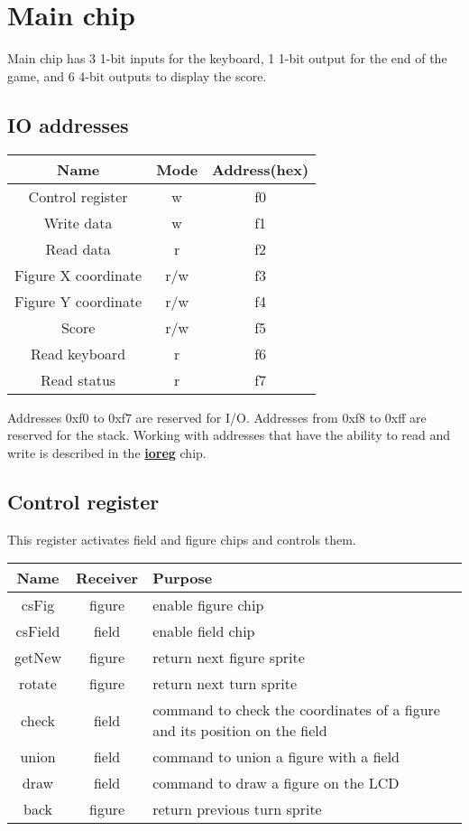 \documentclass[./main.tex]{subfiles}
\begin{document}
	\section{Main chip}
	Main chip has 3 1-bit inputs for the keyboard, 1 1-bit output for the end of the game, and 6 4-bit outputs to display the score.
	\subsection{IO addresses}
	\begin{center}
		\begin{tabular}{|c | c | c|}
			\hline
			Name & Mode & Address(hex) \\
			\hline
			Control register & w & f0 \\
			\hline
			Write data & w & f1 \\
			\hline
			Read data & r & f2 \\
			\hline
			Figure X coordinate & r/w & f3 \\
			\hline
			Figure Y coordinate & r/w & f4 \\
			\hline
			Score & r/w & f5 \\
			\hline
			Read keyboard & r & f6 \\
			\hline
			Read status & r & f7\\
			\hline
		\end{tabular}
	\end{center}


	Addresses 0xf0 to 0xf7 are reserved for I/O.  Addresses from 0xf8 to 0xff are reserved for the stack. Working with addresses that have the ability to read and write is described in the \hyperref[sec:ioreg]{\textbf{ioreg}} chip.
	\subsection{Control register}
	
	
	This register activates field and figure chips and controls them.
	\begin{center}
		\begin{tabular}{|c | c | p{10cm}|}
			\hline
			Name & Receiver & Purpose \\
			\hline
			csFig & figure & enable figure chip \\ 
			\hline
			csField & field & enable field chip \\
			\hline
			getNew & figure &  return next figure sprite \\
			\hline
			rotate & figure & return next turn sprite \\
			\hline
			check & field & command to check the coordinates of a figure and its position on the field \\
			\hline
			union & field & command to union a figure with a field \\
			\hline
			draw & field & command to draw a figure on the LCD \\
			\hline
			back & figure & return previous turn sprite \\
			\hline
		\end{tabular}
	\end{center}
\end{document}
